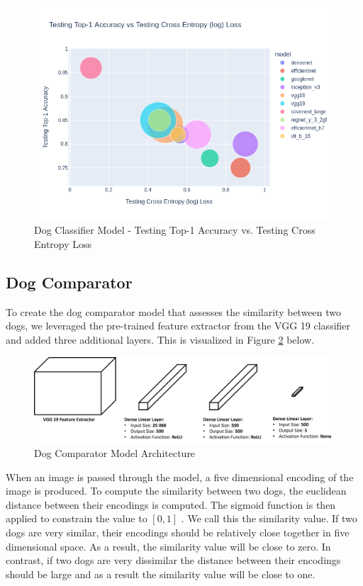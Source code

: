 \documentclass{article}
\begin{document}
\begin{figure}[h]
\centering
	\includegraphics[scale=0.60]{final-report-images/test_accuracy_comp_fig.png}
\caption{Dog Classifier Model - Testing Top-1 Accuracy vs. Testing Cross Entropy Loss}
\label{fig:model2 testing accuracy}
\end{figure}
\clearpage
\subsection{Dog Comparator}
To create the dog comparator model that assesses the similarity between two dogs, we leveraged the pre-trained feature extractor from the VGG 19 classifier \cite{SimonyanKaren2014VDCN} and added three additional layers.  This is visualized in Figure \ref{fig:x comparator} below.

\begin{figure}[h]
\centering
	\includegraphics[scale=0.4]{final-report-images/dog_comparator.png}
\caption{Dog Comparator Model Architecture}
\label{fig:x comparator}
\end{figure}

\noindent When an image is passed through the model, a five dimensional encoding of the image is produced.  To compute the similarity between two dogs, the euclidean distance between their encodings is computed.  The sigmoid function is then applied to constrain the value to $[0,1]$ .  We call this the similarity value.  If two dogs are very similar, their encodings should be relatively close together in five dimensional space.  As a result, the similarity value will be close to zero.  In contrast, if two dogs are very dissimilar the distance between their encodings should be large and as a result the similarity value will be close to one.  
\end{document}
